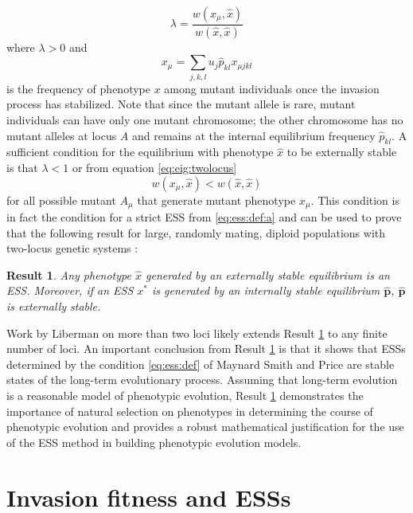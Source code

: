 \documentclass[11pt]{article}
\newcommand{\ess}[1]{#1^*}
\newcommand{\fixp}[1]{\hat{#1}}
\renewcommand{\vec}[1]{\symbf{#1}}
\newcommand{\mut}{\mu}
\newcommand{\eig}{\lambda}
\newtheorem{result}{Result}
\begin{document}
\begin{equation}
  \label{eq:eig:twolocus}
  \eig = \frac{w(x_{\mut}, \fixp{x})}{w(\fixp{x}, \fixp{x})}
\end{equation}
where $\eig>0$ and
\begin{equation}
  \label{eq:mut:pheno:twolocus}
  x_{\mut} = \sum_{j,k,l} u_{j} \fixp{p}_{kl} x_{\mut jkl}
\end{equation}
is the frequency of phenotype $x$ among mutant individuals once the invasion process has stabilized. Note that since the mutant allele is rare, mutant individuals can have only one mutant chromosome; the other chromosome has no mutant alleles at locus $A$ and remains at the internal equilibrium frequency $\fixp{p}_{kl}$. A sufficient condition for the equilibrium with phenotype $\fixp{x}$ to be externally stable is that $\eig < 1$ or from equation \eqref{eq:eig:twolocus}
\begin{equation*}
  w(x_{\mut}, \fixp{x}) < w(\fixp{x}, \fixp{x})
\end{equation*}
for all possible mutant $A_{\mut}$ that generate mutant phenotype $x_{\mut}$. This condition is in fact the condition for a strict ESS from \eqref{eq:ess:def:a} and can be used to prove that the following result for large, randomly mating, diploid populations with two-locus genetic systems \cite{Eshel:Feldman:1984,Eshel:1996,Eshel:Feldman:1998}:
\begin{result}
  \label{res:twolocus}
  Any phenotype $\fixp{x}$ generated by an externally stable equilibrium is an ESS. Moreover, if an ESS $\ess{x}$ is generated by an internally stable equilibrium $\fixp{\vec{p}}$, $\fixp{\vec{p}}$ is externally stable.
\end{result}
\noindent
Work by Liberman \cite{Liberman:1988} on more than two loci likely extends Result \ref{res:twolocus} to any finite number of loci. An important conclusion from Result \ref{res:twolocus} is that it shows that ESSs determined by the condition \eqref{eq:ess:def} of Maynard Smith and Price \cite{Maynard-Smith:Price:1973,Maynard-Smith:1974} are stable states of the long-term evolutionary process. Assuming that long-term evolution is a reasonable model of phenotypic evolution, Result \ref{res:twolocus} demonstrates the importance of natural selection on phenotypes in determining the course of phenotypic evolution and provides a robust mathematical justification for the use of the ESS method in building phenotypic evolution models.

\section{Invasion fitness and ESSs}
\end{document}
